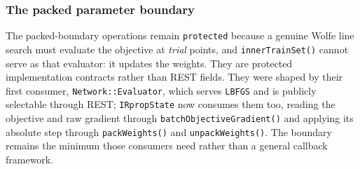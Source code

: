 \subsubsection{The packed parameter boundary}
The packed-boundary operations remain \texttt{protected} because a genuine Wolfe line
search must evaluate the objective at \emph{trial} points, and
\texttt{innerTrainSet()} cannot serve as that evaluator: it updates the weights.
They are protected implementation contracts rather than REST fields.  They were
shaped by their first consumer, \texttt{Network::Evaluator}, which serves
\texttt{LBFGS} and is publicly selectable through REST; \texttt{IRpropState}
now consumes them too, reading the objective and raw gradient through
\texttt{batchObjectiveGradient()} and applying its absolute step through
\texttt{packWeights()} and \texttt{unpackWeights()}.  The boundary remains the
minimum those consumers need rather than a general callback framework.

